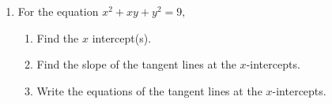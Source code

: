 \documentclass[11pt,fleqn]{article}
\begin{document}
\begin{enumerate}
\item For the equation $x^2+xy+y^2=9,$ 
	\begin{enumerate}
	\item Find the $x$ intercept(s).
	\vspace{.7in}
	\item Find the slope of the tangent lines at the $x$-intercepts.
	\vfill
	\item Write the equations of the tangent lines at the $x$-intercepts.
	\vspace{.5in}
	\end{enumerate} 
 


\end{enumerate}
\end{document}
